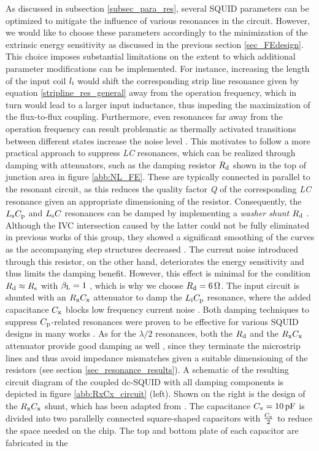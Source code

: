 As discussed in subsection \ref{subsec_para_res}, several SQUID parameters can be optimized to mitigate the influence of various resonances in the circuit. However, we would like to choose these parameters accordingly to the minimization of the extrinsic energy sensitivity as discussed in the previous section \ref{sec_FEdesign}. This choice imposes substantial limitations on the extent to which additional parameter modifications can be implemented. For instance, increasing the length of the input coil $l_{\rm i}$ would shift the corresponding strip line resonance given by equation \ref{stripline_res_general} away from the operation frequency, which in turn would lead to a larger input inductance, thus impeding the maximization of the flux-to-flux coupling. Furthermore, even resonances far away from the operation frequency can result problematic as thermally activated transitions between different states increase the noise level \cite{Sepp1987}. This motivates to follow a more practical approach to suppress \textit{LC} resonances, which can be realized through damping with attenuators, such as the damping resistor $R_{\rm d}$ shown in the top of junction area in figure \ref{abb:NL_FE}. These are typically connected in parallel to the resonant circuit, as this reduces the quality factor \textit{Q} of the corresponding \textit{LC} resonance given an appropriate dimensioning of the resistor. Consequently, the $L_{\rm s}C_{\rm p}$ and $L_{\rm s}C$ resonances can be damped by implementing a \textit{washer shunt} $R_{\rm d}$ \cite{Ono1997, Ryh1992}. Although the IVC intersection caused by the latter could not be fully eliminated in previous works of this group, they showed a significant smoothing of the curves as the accompanying step structures decreased \cite{Bauer2018}. The current noise introduced through this resistor, on the other hand, deteriorates the energy sensitivity and thus limits the damping benefit. However, this effect is minimal for the condition $R_{\rm d}\approx R_{\rm s}$ with $\beta_{\rm L}=1$ \cite{Enpuku1986, Ryh1992}, which is why we choose $R_{\rm d}=\qty{6}{\ohm}$. The input circuit is shunted with an $R_{\rm x}C_{\rm x}$ attenuator to damp the $L_{\rm i}C_{\rm p}$ resonance, where the added capacitance $C_{\rm x}$ blocks low frequency current noise \cite{Sepp1987}. Both damping techniques to suppress $C_{\rm p}$-related resonances were proven to be effective for various SQUID designs in many works \cite{Knuutila1987, Enpuku1986,Can1991,Bauer2018}. As for the $\lambda/2$ resonances, both the $R_{\rm d}$ and the $R_{\rm x}C_{\rm x}$ attenuator provide good damping as well \cite{Can1991}, since they terminate the microstrip lines and thus avoid impedance mismatches given a suitable dimensioning of the resistors (see section \ref{sec_resonance_results}). A schematic of the resulting circuit diagram of the coupled dc-SQUID with all damping components is depicted in figure \ref{abb:RxCx_circuit} (left). Shown on the right is the design of the $R_{\rm x}C_{\rm x}$ shunt, which has been adapted from \cite{Bauer2022}. The capacitance $C_{\rm x}=\qty{10}{\pico\farad}$ is divided into two parallelly connected square-shaped capacitors with $\frac{C_{\rm x}}{2}$ to reduce the space needed on the chip. The top and bottom plate of each capacitor are fabricated in the 